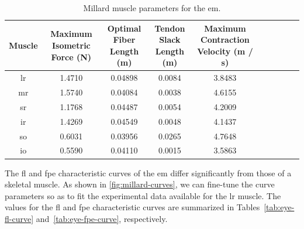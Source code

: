 \documentclass[11pt,a4paper,draft=false]{report}
\begin{document}
\begin{table}[ht]
  \centering
  \caption{Millard muscle parameters for the
    \gls{em}.}\label{tab:eye-muscle-parameters}
  \begin{tabular}{@{}cccccccccc@{}}
    \toprule
    \thead{Muscle \\ \quad}
    & \thead{Maximum Isometric \\ Force (N)}  %
    & \thead{Optimal Fiber \\ Length (m)}
    & \thead{Tendon Slack \\ Length (m)}
    & \thead{Maximum Contraction \\ Velocity (m / s)} \\
    \midrule
    \gls{lr} & 1.4710 & 0.04898 & 0.0084 & 3.8483 \\
    \gls{mr} & 1.5740 & 0.04084 & 0.0038 & 4.6155 \\
    \gls{sr} & 1.1768 & 0.04487 & 0.0054 & 4.2009 \\
    \gls{ir} & 1.4269 & 0.04549 & 0.0048 & 4.1437 \\
    \gls{so} & 0.6031 & 0.03956 & 0.0265 & 4.7648 \\
    \gls{io} & 0.5590 & 0.04110 & 0.0015 & 3.5863 \\
    \bottomrule
  \end{tabular}
\end{table}

The \gls{fl} and \gls{fpe} characteristic curves of the \gls{em} differ
significantly from those of a skeletal muscle. As shown in
\autoref{fig:millard-curves}, we can fine-tune the curve parameters so as to fit
the experimental data available for the \gls{lr} muscle. The values for the
\gls{fl} and \gls{fpe} characteristic curves are summarized in
Tables~\ref{tab:eye-fl-curve} and~\ref{tab:eye-fpe-curve}, respectively.
\end{document}
